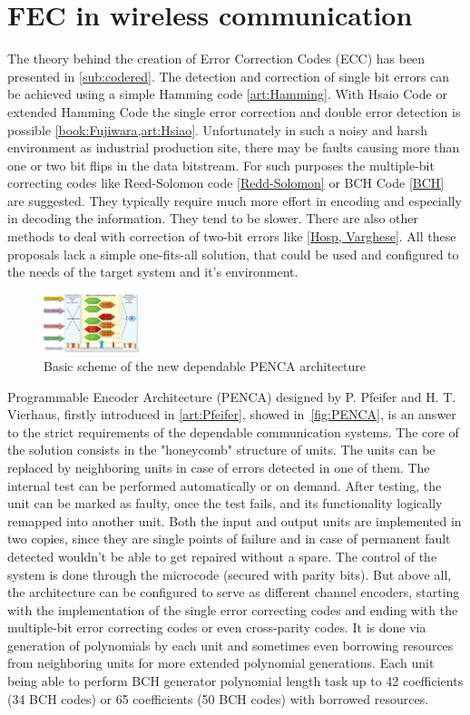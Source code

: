 \section{FEC in wireless communication}\label{sec:PENCA}
The theory behind the creation of Error Correction Codes (ECC) has been presented in \autoref{sub:codered}. The detection and correction of single bit errors can be achieved using a simple Hamming code \ref{art:Hamming}. With Hsaio Code or extended Hamming Code the single error correction and double error detection is possible \ref{book:Fujiwara,art:Hsiao}. Unfortunately in such a noisy and harsh environment as industrial production site, there may be faults causing more than one or two bit flips in the data bitstream. For such purposes the multiple-bit correcting codes like Reed-Solomon code \ref{Redd-Solomon} or BCH Code \ref{BCH} are suggested. They typically require much more effort in  encoding and especially in decoding the information. They tend to be slower. There are also other methods to deal with correction of two-bit errors like \ref{Hosp, Varghese}. All these proposals lack a simple one-fits-all solution, that could be used and configured to the needs of the target system and it's environment.

\begin{figure}[h]
\centering
\includegraphics[width=0.25\textwidth]{figures/PENCA.png}
\caption{Basic scheme of the new dependable PENCA architecture~\cite{art:Pfeifer}}
\label{fig:PENCA}
\end{figure}

Programmable Encoder Architecture (PENCA) designed by P. Pfeifer and H. T. Vierhaus, firstly introduced in \ref{art:Pfeifer}, showed in~\autoref{fig:PENCA}, is an answer to the strict requirements of the dependable communication systems. The core of the solution consists in the "honeycomb" structure of units. The units can be replaced by neighboring units in case of errors detected in one of them. The internal test can be performed automatically or on demand. After testing, the unit can be marked as faulty, once the test fails, and its functionality logically remapped into another unit. Both the input and output units are implemented in two copies, since they are single points of failure and in case of permanent fault detected wouldn't be able to get repaired without a spare. The control of the system is done through the microcode (secured with parity bits). But above all, the architecture can be configured to serve as different channel encoders, starting with the implementation of the single error correcting codes and ending with the multiple-bit error correcting codes or even cross-parity codes. It is done via generation of polynomials by each unit and sometimes even borrowing resources from neighboring units for more extended polynomial generations. Each unit being able to perform BCH generator polynomial length task up to 42 coefficients (34 BCH codes) or 65 coefficients (50 BCH codes) with borrowed resources.
